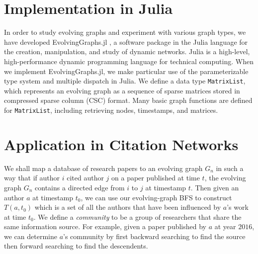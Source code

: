 \documentclass[11pt, conference, , compsocconf]{IEEEtran}
\theoremstyle{definition}
\begin{document}

\section{Implementation in Julia}
\label{sec:implementation-julia}

In order to study evolving graphs and experiment with various graph types, we have developed EvolvingGraphs.jl  \cite{zhang15}, a software package in the Julia language \cite{bkse12} for the creation, manipulation, and study of dynamic networks.  
Julia is a high-level, high-performance dynamic programming language for technical
computing. When we implement EvolvingGraphs.jl, we make particular use of 
the parameterizable type system and multiple dispatch in Julia. 
We define a data type  \texttt{MatrixList}, which represents an evolving graph
as a sequence of sparse matrices stored in compressed sparse column (CSC) format. 
Many basic graph functions are defined for \texttt{MatrixList}, including 
retrieving nodes, timestamps, and matrices.

\section{Application in Citation Networks}
\label{sec:applications}

We shall map a database of research papers to an evolving graph $G_n$
in such a way that if author $i$ cited author $j$ on a paper published
at  time $t$, the evolving graph $G_n$ contains a directed edge from
$i$ to $j$ at timestamp $t$. Then given an author $a$ at timestamp $t_0$,
we can use our evolving-graph BFS to construct $T(a, t_0)$ which is 
a set of all the authors that have been influenced by $a$'s work at  
time $t_0$. We define a \emph{community} to be a group of 
researchers that share the same information source. 
For example, given a paper published by $a$ at year $2016$, 
we can determine $a$'s community by first backward searching to 
find the source then forward searching to find the descendents.
\end{document}
